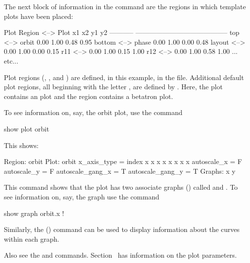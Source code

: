 
The next block of information in the  command are the regions in which
template plots have been placed:
\begin{example}
  Plot Region         <-->  Plot                 x1    x2    y1    y2
  -----------               -----------------------------------------
  top                 <-->  orbit               0.00  1.00  0.48  0.95
  bottom              <-->  phase               0.00  1.00  0.00  0.48
  layout              <-->                      0.00  1.00  0.00  0.15
  r11                 <-->                      0.00  1.00  0.15  1.00
  r12                 <-->                      0.00  1.00  0.58  1.00
  ... etc...
\end{example}
Plot regions (, , and ) are defined, in this example, in the
 file. Additional default plot regions, all beginning with the letter , are
defined by \tao. Here, the  plot contains an  plot and the  region
contains a betatron  plot.

To see information on, say, the orbit plot, use the command
\begin{example}
  show plot orbit
\end{example}
This shows:
\begin{example}
  Region:  orbit
  Plot:  orbit
  x_axis_type          = index
  x%
  x%
  x%
  x%
  x%
  x%
  x%
  x%
  autoscale_x          = F
  autoscale_y          = F
  autoscale_gang_x     = T
  autoscale_gang_y     = T
  Graphs:
     x
     y
\end{example}
This command shows that the  plot has two associate graphs () called
 and .  To see information on, say, the  graph use the command 
\begin{example}
  show graph orbit.x    ! 
\end{example}
Similarly, the  () command can be used to display
information about the curves within each graph.

Also see the  and  commands.
Section~ has information on the plot parameters.


